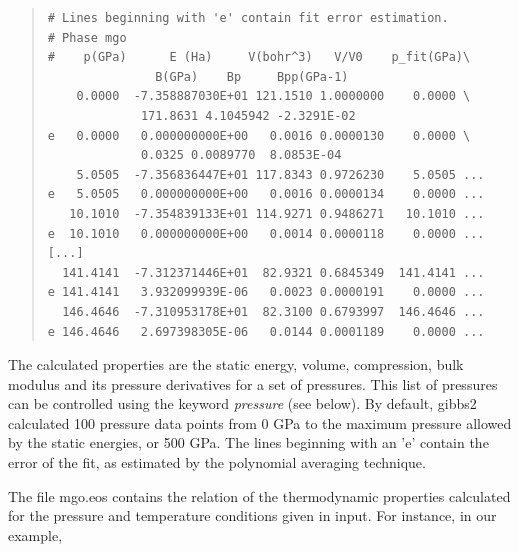 \documentclass[a4paper]{article}
\begin{document}
\begin{quote}
\begin{verbatim}
# Lines beginning with 'e' contain fit error estimation.
# Phase mgo
#    p(GPa)      E (Ha)     V(bohr^3)   V/V0    p_fit(GPa)\
               B(GPa)    Bp     Bpp(GPa-1)
    0.0000  -7.358887030E+01 121.1510 1.0000000    0.0000 \
             171.8631 4.1045942 -2.3291E-02
e   0.0000   0.000000000E+00   0.0016 0.0000130    0.0000 \
             0.0325 0.0089770  8.0853E-04
    5.0505  -7.356836447E+01 117.8343 0.9726230    5.0505 ...
e   5.0505   0.000000000E+00   0.0016 0.0000134    0.0000 ...
   10.1010  -7.354839133E+01 114.9271 0.9486271   10.1010 ...
e  10.1010   0.000000000E+00   0.0014 0.0000118    0.0000 ...
[...]
  141.4141  -7.312371446E+01  82.9321 0.6845349  141.4141 ...
e 141.4141   3.932099939E-06   0.0023 0.0000191    0.0000 ...
  146.4646  -7.310953178E+01  82.3100 0.6793997  146.4646 ...
e 146.4646   2.697398305E-06   0.0144 0.0001189    0.0000 ...
\end{verbatim}
\end{quote}

The calculated properties are the static energy, volume, compression,
bulk modulus and its pressure derivatives for a set of pressures. This
list of pressures can be controlled using the keyword \emph{pressure} (see
below). By default, gibbs2 calculated 100 pressure data points from 0
GPa to the maximum pressure allowed by the static energies, or 500
GPa. The lines beginning with an 'e' contain the error of the fit, as
estimated by the polynomial averaging technique.

The file mgo.eos contains the relation of the thermodynamic properties
calculated for the pressure and temperature conditions given in
input. For instance, in our example,
\end{document}
